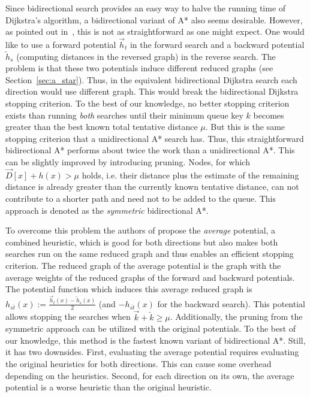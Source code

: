 \documentclass[a4paper,UKenglish,cleveref, autoref, thm-restate]{lipics-v2021}
\begin{document}
Since bidirectional search provides an easy way to halve the running time of Dijkstra's algorithm, a bidirectional variant of A* also seems desirable.
However, as pointed out in~\cite{gh-cspas-05}, this is not as straightforward as one might expect.
One would like to use a forward potential $\overrightarrow{h}_t$ in the forward search and a backward potential $\overleftarrow{h}_s$ (computing distances in the reversed graph) in the reverse search.
The problem is that these two potentials induce different reduced graphs (see Section~\ref{sec:a_star}).
Thus, in the equivalent bidirectional Dijkstra search each direction would use different graph.
This would break the bidirectional Dijkstra stopping criterion.
To the best of our knowledge, no better stopping criterion exists than running \emph{both} searches until their minimum queue key $k$ becomes greater than the best known total tentative distance $\mu$.
But this is the same stopping criterion that a unidirectional A* search has.
Thus, this straightforward bidirectional A* performs about twice the work than a unidirectional A*.
This can be slightly improved by introducing pruning.
Nodes, for which $\overrightarrow{D}[x] + h(x) > \mu$ holds, i.e. their distance plus the estimate of the remaining distance is already greater than the currently known tentative distance, can not contribute to a shorter path and need not to be added to the queue.
This approach is denoted as the \emph{symmetric} bidirectional A*.

To overcome this problem the authors of propose the \emph{average} potential, a combined heuristic, which is good for both directions but also makes both searches run on the same reduced graph and thus enables an efficient stopping criterion.
The reduced graph of the average potential is the graph with the average weights of the reduced graphs of the forward and backward potentials.
The potential function which induces this average reduced graph is $h_{\overline{st}}(x) := \frac{\overrightarrow{h}_t(x) - \overleftarrow{h}_s(x)}{2}$ (and $-h_{\overline{st}}(x)$ for the backward search).
This potential allows stopping the searches when $\overrightarrow{k} + \overleftarrow{k} \geq \mu$.
Additionally, the pruning from the symmetric approach can be utilized with the original potentials.
To the best of our knowledge, this method is the fastest known variant of bidirectional A*.
Still, it has two downsides.
First, evaluating the average potential requires evaluating the original heuristics for both directions.
This can cause some overhead depending on the heuristics.
Second, for each direction on its own, the average potential is a worse heuristic than the original heuristic.
\end{document}
